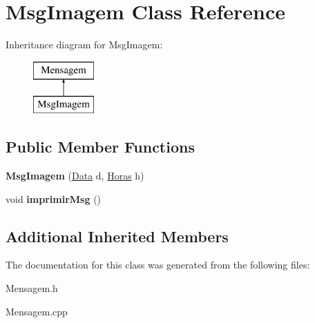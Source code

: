 \hypertarget{class_msg_imagem}{}\section{Msg\+Imagem Class Reference}
\label{class_msg_imagem}
Inheritance diagram for Msg\+Imagem\+:\begin{figure}[H]
\begin{center}
\leavevmode
\includegraphics[height=2.000000cm]{class_msg_imagem}
\end{center}
\end{figure}
\subsection*{Public Member Functions}
\begin{DoxyCompactItemize}
\item 
\hypertarget{class_msg_imagem_af214317005643374b9886897ddc28e9c}{}{\bfseries Msg\+Imagem} (\hyperlink{class_data}{Data} d, \hyperlink{class_horas}{Horas} h)\label{class_msg_imagem_af214317005643374b9886897ddc28e9c}

\item 
\hypertarget{class_msg_imagem_a70e0cf4e47ecaee095501d211e010e27}{}void {\bfseries imprimir\+Msg} ()\label{class_msg_imagem_a70e0cf4e47ecaee095501d211e010e27}

\end{DoxyCompactItemize}
\subsection*{Additional Inherited Members}


The documentation for this class was generated from the following files\+:\begin{DoxyCompactItemize}
\item 
Mensagem.\+h\item 
Mensagem.\+cpp\end{DoxyCompactItemize}

